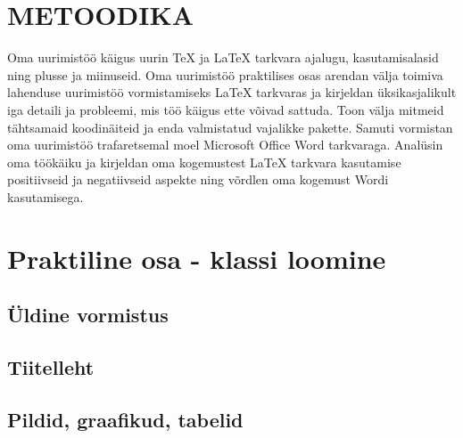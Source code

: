 \documentclass{21kuur}
\begin{document}
\chapter{METOODIKA}
Oma uurimist\"{o}\"{o} k\"{a}igus uurin TeX ja LaTeX tarkvara ajalugu, kasutamisalasid ning plusse ja miinuseid. Oma uurimist\"{o}\"{o} praktilises osas arendan v\"{a}lja toimiva lahenduse uurimist\"{o}\"{o} vormistamiseks LaTeX tarkvaras ja kirjeldan \"{u}ksikasjalikult iga detaili ja probleemi, mis t\"{o}\"{o} k\"{a}igus ette v\~{o}ivad sattuda. Toon v\"{a}lja mitmeid t\"{a}htsamaid koodin\"{a}iteid ja enda valmistatud vajalikke pakette. Samuti vormistan oma uurimist\"{o}\"{o} trafaretsemal moel Microsoft Office Word tarkvaraga. Anal\"{u}sin oma t\"{o}\"{o}k\"{a}iku ja kirjeldan oma kogemustest LaTeX tarkvara kasutamise positiivseid ja negatiivseid aspekte ning v\~{o}rdlen oma kogemust Wordi kasutamisega.

\chapter{Praktiline osa - klassi loomine}
\section{Üldine vormistus}
\section{Tiitelleht}
\section{Pildid, graafikud, tabelid}
\end{document}
